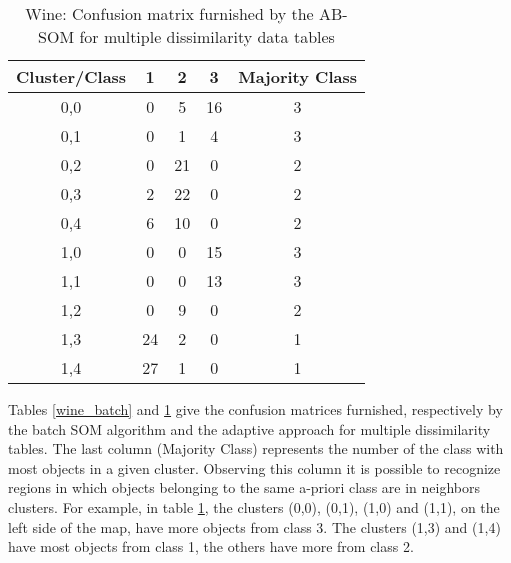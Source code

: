 \documentclass[10pt, conference, compsocconf]{IEEEtran}
\begin{document}
\begin{table}[!h]
\renewcommand{\arraystretch}{1.2}
\begin{center}
\caption{Wine: Confusion matrix furnished by the AB-SOM for multiple dissimilarity data tables}
\begin{tabular}{|c|c|c|c||c|}
\hline
Cluster/Class & 1 & 2 & 3 & Majority Class \\ \hline
0,0 & 0 & 5 & 16 & 3 \\ \hline
0,1 & 0 & 1 & 4 & 3\\ \hline
0,2 & 0 & 21 & 0 & 2\\ \hline
0,3 & 2 & 22 & 0 & 2\\ \hline
0,4 & 6 & 10 & 0 & 2\\ \hline \hline
1,0 & 0 & 0 & 15 & 3\\ \hline
1,1 & 0 & 0 & 13 & 3\\ \hline
1,2 & 0 & 9 & 0 & 2\\ \hline
1,3 & 24 & 2 & 0 & 1\\ \hline
1,4 & 27 & 1 & 0 & 1\\ \hline

\end{tabular}
\label{wine_adaptativo}
\end{center}
\end{table}

Tables \ref{wine_batch} and \ref{wine_adaptativo} give the confusion matrices furnished, respectively by the batch SOM algorithm and the adaptive approach for multiple dissimilarity tables. The last column (Majority Class) represents the number of the class with most objects in a given cluster. Observing this column it is possible to recognize regions in which objects belonging to the same a-priori class are in neighbors clusters. For example, in table \ref{wine_adaptativo}, the clusters (0,0), (0,1), (1,0) and (1,1), on the left side of the map, have more objects from class 3. The clusters (1,3) and (1,4) have most objects from class 1, the others have more from class 2.

\end{document}

